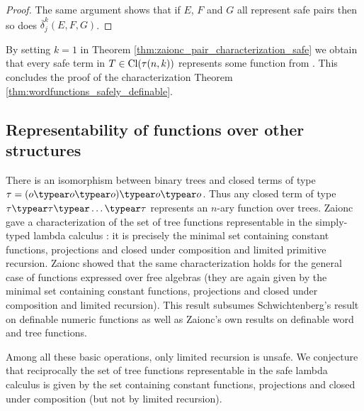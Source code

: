 \begin{proof}
  The same argument shows that if $E$, $F$ and $G$ all represent safe pairs
then so does $\overline \delta^k_j (E,F,G)$.
\end{proof}


By setting $k=1$ in Theorem \ref{thm:zaionc_pair_characterization_safe} we obtain that every safe term in $T \in {\rm Cl}(\tau(n,k))$ represents some function from \safedefset. This concludes the proof of the characterization Theorem \ref{thm:wordfunctions_safely_definable}.


\subsection{Representability of functions over other structures}\hfill

There is an isomorphism between binary trees and closed terms of
type $\tau =(o\typear o\typear o) \typear o \typear o$. Thus any
closed term of type $\tau\typear\tau \typear \ldots \typear \tau $
represents an $n$-ary function over trees. Zaionc gave a
characterization of the set of tree functions representable in the
simply-typed lambda calculus \cite{DBLP:conf/aluacs/Zaionc88}: it is
precisely the minimal set containing constant functions, projections
and closed under composition and limited primitive recursion. Zaionc
showed that the same characterization holds for the general case of
functions expressed over free algebras
\cite{DBLP:journals/apal/Zaionc91} (they are again given by the
minimal set containing constant functions, projections and closed
under composition and limited recursion). This result subsumes
Schwichtenberg's result on definable numeric functions as well as
Zaionc's own results on definable word and tree functions.

Among all these basic operations, only limited recursion is unsafe.
We conjecture that reciprocally the set of tree functions
representable in the safe lambda calculus is given by the set
containing constant functions, projections and closed under
composition (but not by limited recursion).
